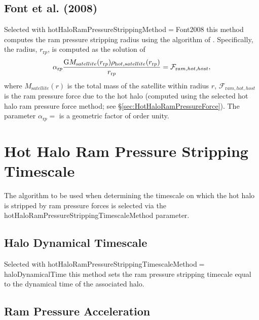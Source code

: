 \subsection{Font et al. (2008)}

Selected with {\normalfont \ttfamily hotHaloRamPressureStrippingMethod}$=${\normalfont \ttfamily Font2008} this method computes the ram pressure stripping radius using the algorithm of \cite{font_colours_2008}. Specifically, the radius, $r_{\mathrm rp}$, is computed as the solution of
\begin{equation}
\alpha_{\mathrm rp} {{\mathrm G} M_{\mathrm satellite}(r_{\mathrm rp}) \rho_{\mathrm hot, satellite}(r_{\mathrm rp}) \over r_{\mathrm rp} } = \mathcal{F}_{\mathrm ram, hot, host},
\end{equation}
where $M_{\mathrm satellite}(r)$ is the total mass of the satellite within radius $r$, $\mathcal{F}_{\mathrm ram, hot, host}$ is the ram pressure force due to the hot halo (computed using the selected hot halo ram pressure force method; see \S\ref{sec:HotHaloRamPressureForce}). The parameter $\alpha_{\mathrm rp}=${\normalfont \ttfamily [ramPressureStrippingFormFactor]} is a geometric factor of order unity.


\section{Hot Halo Ram Pressure Stripping Timescale}

The algorithm to be used when determining the timescale on which the hot halo is stripped by ram pressure forces is selected via the {\normalfont \ttfamily hotHaloRamPressureStrippingTimescaleMethod} parameter.

\subsection{Halo Dynamical Timescale}

Selected with {\normalfont \ttfamily hotHaloRamPressureStrippingTimescaleMethod}$=${\normalfont \ttfamily haloDynamicalTime} this method sets the ram pressure stripping timecale equal to the dynamical time of the associated halo.

\subsection{Ram Pressure Acceleration}

